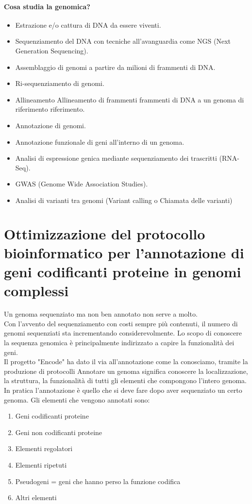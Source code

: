 \documentclass{article}
\begin{document}
\paragraph{Cosa studia la genomica?}
\begin{itemize}
    \item Estrazione e/o cattura di DNA da essere viventi.
    \item Sequenziamento del DNA con tecniche all’avanguardia come NGS
    (Next Generation Sequencing).
    \item Assemblaggio di genomi a partire da milioni di frammenti di DNA.
    \item Ri-sequenziamento di genomi.
    \item Allineamento Allineamento di frammenti frammenti di DNA a un genoma di riferimento riferimento. \item Annotazione di genomi. \item Annotazione funzionale di geni all’interno di un genoma.
    \item Analisi di espressione genica mediante sequenziamento dei
    trascritti (RNA-Seq).
    \item GWAS (Genome Wide Association Studies).
    \item Analisi di varianti tra genomi (Variant calling o Chiamata delle
    varianti)
\end{itemize}

\section{Ottimizzazione del protocollo bioinformatico per l’annotazione di geni codificanti proteine in genomi complessi}
Un genoma sequenziato ma non ben annotato non serve a molto.\\
Con l’avvento del sequenziamento con costi sempre più contenuti, il numero di genomi sequenziati sta incrementando considerevolmente. Lo scopo di conoscere la sequenza genomica è principalmente indirizzato a capire la funzionalità dei geni.\\
Il progetto "Encode" ha dato il via all'annotazione come la conosciamo, tramite la produzione di protocolli
Annotare un genoma significa conoscere la localizzazione, la struttura, la funzionalità di tutti gli elementi che compongono l’intero genoma. In pratica l’annotazione è quello che si deve fare dopo aver sequenziato un certo genoma. Gli elementi che vengono annotati sono:
\begin{enumerate}
    \item Geni codificanti proteine
    \item Geni non codificanti proteine
    \item Elementi regolatori
    \item Elementi ripetuti
    \item Pseudogeni = geni che hanno perso la funzione codifica
    \item Altri elementi
\end{enumerate}
\end{document}
